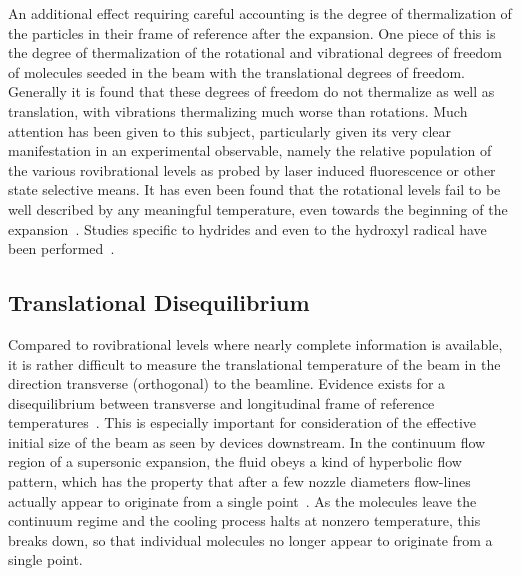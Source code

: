 An additional effect requiring careful accounting is the degree of thermalization of the particles in their frame of reference after the expansion.
One piece of this is the degree of thermalization of the rotational and vibrational degrees of freedom of molecules seeded in the beam with the translational degrees of freedom.
Generally it is found that these degrees of freedom do not thermalize as well as translation, with vibrations thermalizing much worse than rotations.
Much attention has been given to this subject, particularly given its very clear manifestation in an experimental observable, namely the relative population of the various rovibrational levels as probed by laser induced fluorescence or other state selective means.
It has even been found that the rotational levels fail to be well described by any meaningful temperature, even towards the beginning of the expansion~\cite{Hulsman2001}.
Studies specific to hydrides and even to the hydroxyl radical have been performed~\cite{Belikov2001}. 

\subsection{Translational Disequilibrium}\label{transdissec}

Compared to rovibrational levels where nearly complete information is available, it is rather difficult to measure the translational temperature of the beam in the direction transverse (orthogonal) to the beamline. 
Evidence exists for a disequilibrium between transverse and longitudinal frame of reference temperatures~\cite{beijerinck1981,Toennies1977,Miller1988}.
This is especially important for consideration of the effective initial size of the beam as seen by devices downstream.
In the continuum flow region of a supersonic expansion, the fluid obeys a kind of hyperbolic flow pattern, which has the property that after a few nozzle diameters flow-lines actually appear to originate from a single point~\cite{Miller1988}.
As the molecules leave the continuum regime and the cooling process halts at nonzero temperature, this breaks down, so that individual molecules no longer appear to originate from a single point.

